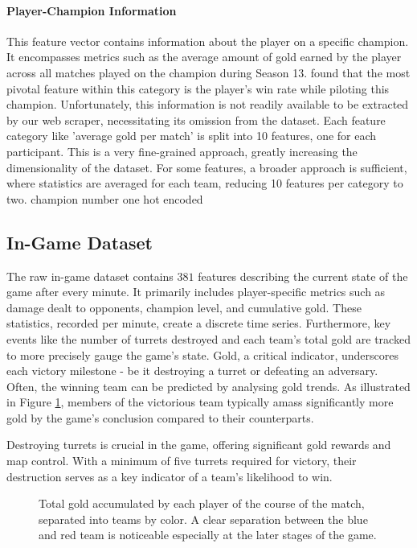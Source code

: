 \documentclass[12pt, a4paper, headinclude, twoside, plainheadsepline, open=right, numbers=noenddot, hidelinks, toc=listof, toc=bibliography]{scrreprt}
\begin{document}
\paragraph{Player-Champion Information}
This feature vector contains information about the player on a specific champion.
It encompasses metrics such as the average amount of gold earned by the player across all matches played on the champion during Season 13. 
 \cite{costaFeatureAnalysisLeague2021} found that  the most pivotal feature within this category is the player's win rate while piloting this champion.
Unfortunately, this information is not readily available to be extracted by our web scraper,  necessitating its omission from the dataset.
Each feature category like 'average gold per match' is split into 10 features, one for each participant.
This is a very fine-grained approach, greatly increasing the dimensionality of the dataset.
For some features, a broader approach is sufficient, where statistics are averaged for each team, reducing 10 features per category to two.
champion number one hot encoded


\subsection{In-Game Dataset}
\label{ssec:in_game_data}

The raw in-game dataset contains $381$ features describing the current state of the game after every minute.
It primarily includes player-specific metrics such as damage dealt to opponents, champion level, and cumulative gold. These statistics, recorded per minute, create a discrete time series. Furthermore, key events like the number of turrets destroyed and each team's total gold are tracked to more precisely gauge the game's state. Gold, a critical indicator, underscores each victory milestone - be it destroying a turret or defeating an adversary. Often, the winning team can be predicted by analysing gold trends. As illustrated in Figure \ref{fig:totalGold}, members of the victorious team typically amass significantly more gold by the game's conclusion compared to their counterparts.

Destroying turrets is crucial in the game, offering significant gold rewards and map control. 
With a minimum of five turrets required for victory, their destruction serves as a key indicator of a team's likelihood to win.

\begin{figure}

\caption{Total gold accumulated by each player of the course of the match, separated into teams by color. 
A clear separation between the blue and red team is noticeable especially at the later stages of the game.}
\label{fig:totalGold}
\end{figure}
\end{document}

